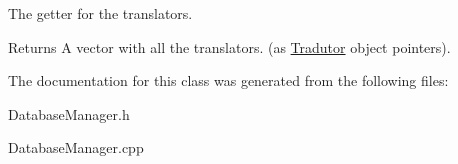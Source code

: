 The getter for the translators. 

\begin{DoxyReturn}{Returns}
A vector with all the translators. (as \hyperlink{class_tradutor}{Tradutor} object pointers). 
\end{DoxyReturn}


The documentation for this class was generated from the following files\-:\begin{DoxyCompactItemize}
\item 
Database\-Manager.\-h\item 
Database\-Manager.\-cpp\end{DoxyCompactItemize}
